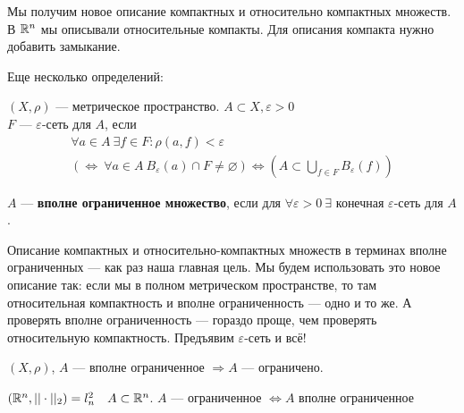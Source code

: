 \documentclass[document]{subfiles}
\begin{document}
Мы получим новое описание компактных и относительно компактных множеств. В $\mathbb{R}^n$ мы описывали относительные компакты. Для описания компакта 
нужно добавить замыкание.

Еще несколько определений:
\begin{definition}
    $(X, \rho)$ --- метрическое пространство. $A \subset X, \varepsilon > 0$ \\
    $F$ --- $\varepsilon$-сеть для $A$, если 
    \begin{multline*}
        \forall a \in A \: \exists f \in F: \rho(a,f) < \varepsilon \\
        (\Leftrightarrow \: \forall a \in A \: B_\varepsilon(a) \cap F \ne \varnothing) \Leftrightarrow (A \subset \bigcup_{f \in F} B_{\varepsilon}(f))
    \end{multline*}
\end{definition}

\begin{definition}
    $A$ --- \textbf{вполне ограниченное множество}, если для $\forall \varepsilon > 0 \: \exists$ конечная $\varepsilon$-сеть для $A$.
\end{definition}

Описание компактных и относительно-компактных множеств в терминах вполне ограниченных --- как раз наша главная цель.
Мы будем использовать это новое описание так: если мы в полном метрическом пространстве, то там относительная компактность и вполне ограниченность --- одно и то же.
А проверять вполне ограниченность --- гораздо проще, чем проверять относительную компактность. Предъявим $\varepsilon$-сеть и всё!

\begin{remark}
    $(X,\rho)$, $A$ --- вполне ограниченное $\Rightarrow A$ --- ограничено.
\end{remark}

\begin{example}
    $(\mathbb{R}^n, || \cdot ||_2) = l^2_n \quad A \subset \mathbb{R}^n$. $A$ --- ограниченное $\Leftrightarrow A$ вполне ограниченное
\end{example}
\end{document}

